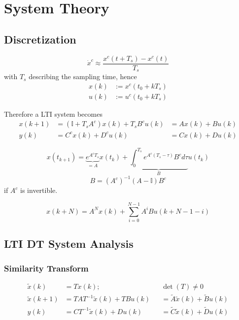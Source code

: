 \section{System Theory}
\subsection{Discretization}
\begin{equation*}
    \dot{x}^c \approx \frac{x^c(t + T_s)-x^c(t)}{T_s}
\end{equation*}
with $T_s$ describing the sampling time, hence
\begin{align*}
    x(k) & := x^c(t_0 + kT_s) \\
    u(k) & := u^c(t_0 + kT_s)
\end{align*}

Therefore a LTI system becomes
\begin{align*}
    x(k+1) & = (\mathbb{I} + T_s A^c) x(k) + T_s B^c u(k) & = A x(k) + B u(k) \\
    y(k)   & = C^c x(k) + D^c u(k)                        & = C x(k) + D u(k)
\end{align*}

\newpar{}
\begin{equation*}
    x(t_{k+1}) = \underbrace{e^{A^c T_s}}_{=A} x(t_k) + \underbrace{\int_{0}^{T_s} e^{A^c(T_s - \tau)}B^c d\tau}_{B} u(t_k)
\end{equation*}
\begin{equation*}
    B={(A^c)}^{-1}(A-\mathbb{I})B^c
\end{equation*}
if $A^c$ is invertible.

\newpar{}
\begin{equation*}
    x(k+N) = A^N x(k) + \sum_{i=0}^{N-1} A^i B u(k+N-1-i)
\end{equation*}

\subsection{LTI DT System Analysis}
\subsubsection{Similarity Transform}
\noindent
\begin{align*}
    \widetilde{x}(k)   & = Tx(k);                              &  & \det(T) \neq 0                                        \\
    \widetilde{x}(k+1) & = TAT^{-1} \widetilde{x}(k) + TB u(k) &  & = \widetilde{A} \widetilde{x}(k) + \widetilde{B} u(k) \\
    y(k)               & = CT^{-1} \widetilde{x}(k) + D u(k)   &  & = \widetilde{C} \widetilde{x}(k) + \widetilde{D} u(k)
\end{align*}

